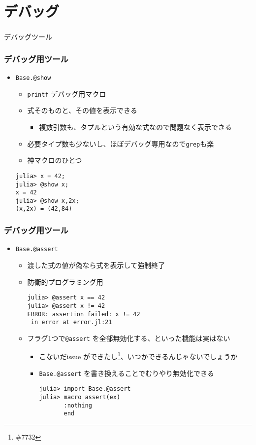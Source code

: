 \section{デバッグ}

\begin{frame}
  \frametitle{}
  {\Huge デバッグツール}
\end{frame}

\begin{frame}[containsverbatim]
\frametitle{デバッグ用ツール}
\begin{itemize}
  \item \verb|Base.@show|
    \begin{itemize}
      \item \verb|printf| デバッグ用マクロ
      \item 式そのものと、その値を表示できる
        \begin{itemize}
          \item 複数引数も、タプルという有効な式なので問題なく表示できる
        \end{itemize}
      \item 必要タイプ数も少ないし、ほぼデバッグ専用なので\verb|grep|も楽
      \item 神マクロのひとつ
    \end{itemize}
    \begin{lstlisting}
julia> x = 42;
julia> @show x;
x = 42
julia> @show x,2x;
(x,2x) = (42,84)
\end{lstlisting}
\end{itemize}
\end{frame}

\begin{frame}[containsverbatim]
\frametitle{デバッグ用ツール}
\begin{itemize}
  \item \verb|Base.@assert|
    \begin{itemize}
      \item 渡した式の値が偽なら式を表示して強制終了
      \item 防衛的プログラミング用
\begin{lstlisting}
julia> @assert x == 42
julia> @assert x != 42
ERROR: assertion failed: x != 42
 in error at error.jl:21
 \end{lstlisting}
 \item フラグ1つで\verb|@assert| を全部無効化する、といった機能は実はない
   \begin{itemize}
     \item こないだissue ができたし\footnote{\#7732}、いつかできるんじゃないでしょうか
     \item \verb|Base.@assert| を書き換えることでむりやり無効化できる
       \begin{lstlisting}
julia> import Base.@assert
julia> macro assert(ex)
       :nothing
       end
       \end{lstlisting}
   \end{itemize}
\end{itemize}
\end{itemize}
\end{frame}

